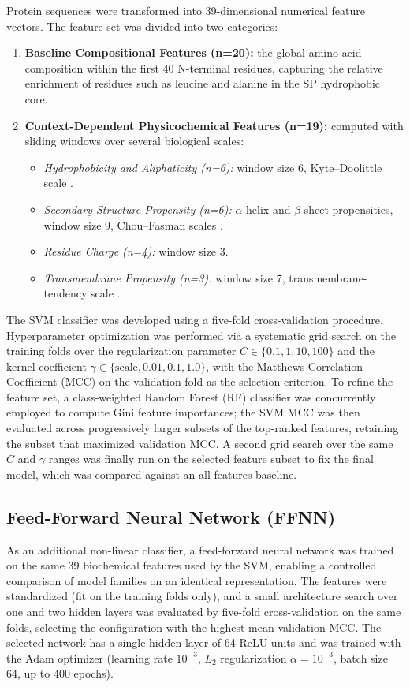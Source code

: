 \documentclass[unnumsec,webpdf,contemporary,large]{oup-authoring-template}
\begin{document}
Protein sequences were transformed into 39-dimensional numerical feature vectors. The feature set was divided into two categories:
\begin{enumerate}
\item \textbf{Baseline Compositional Features (n=20):} the global amino-acid composition within the first 40 N-terminal residues, capturing the relative enrichment of residues such as leucine and alanine in the SP hydrophobic core.
\item \textbf{Context-Dependent Physicochemical Features (n=19):} computed with sliding windows over several biological scales:
\begin{itemize}
\item \textit{Hydrophobicity and Aliphaticity (n=6):} window size 6, Kyte--Doolittle scale \cite{ref15}.
\item \textit{Secondary-Structure Propensity (n=6):} $\alpha$-helix and $\beta$-sheet propensities, window size 9, Chou--Fasman scales \cite{ref9,ref10}.
\item \textit{Residue Charge (n=4):} window size 3.
\item \textit{Transmembrane Propensity (n=3):} window size 7, transmembrane-tendency scale \cite{ref24}.
\end{itemize}
\end{enumerate}

The SVM classifier was developed using a five-fold cross-validation procedure. Hyperparameter optimization was performed via a systematic grid search on the training folds over the regularization parameter $C \in \{0.1, 1, 10, 100\}$ and the kernel coefficient $\gamma \in \{\mathrm{scale}, 0.01, 0.1, 1.0\}$, with the Matthews Correlation Coefficient (MCC) on the validation fold as the selection criterion. To refine the feature set, a class-weighted Random Forest (RF) classifier was concurrently employed to compute Gini feature importances; the SVM MCC was then evaluated across progressively larger subsets of the top-ranked features, retaining the subset that maximized validation MCC. A second grid search over the same $C$ and $\gamma$ ranges was finally run on the selected feature subset to fix the final model, which was compared against an all-features baseline.

\subsection{Feed-Forward Neural Network (FFNN)}

As an additional non-linear classifier, a feed-forward neural network was trained on the same 39 biochemical features used by the SVM, enabling a controlled comparison of model families on an identical representation. The features were standardized (fit on the training folds only), and a small architecture search over one and two hidden layers was evaluated by five-fold cross-validation on the same folds, selecting the configuration with the highest mean validation MCC. The selected network has a single hidden layer of 64 ReLU units and was trained with the Adam optimizer (learning rate $10^{-3}$, $L_2$ regularization $\alpha=10^{-3}$, batch size 64, up to 400 epochs).
\end{document}
